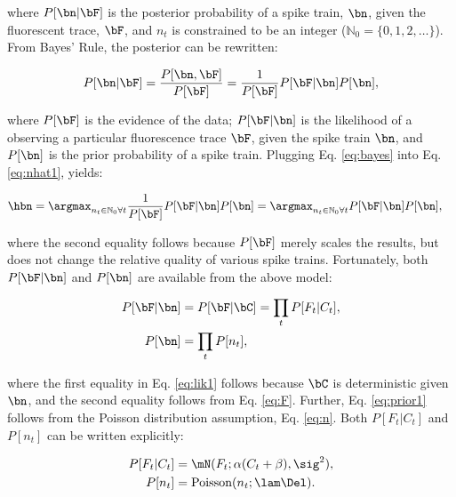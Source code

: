 \noindent where $P[\bn | \bF]$ is the posterior probability of a spike train, $\bn$, given the fluorescent trace, $\bF$, and $n_t$ is constrained to be an integer ($\mathbb{N}_0=\{0,1,2,\ldots\}$).  From Bayes' Rule, the posterior can be rewritten:

\begin{align} \label{eq:bayes}
P[\bn | \bF] = \frac{P[\bn, \bF]}{P[\bF]} = \frac{1}{P[\bF]} P[\bF | \bn] P[\bn],
\end{align}

\noindent where $P[\bF]$ is the evidence of the data; $P[\bF | \bn]$ is the likelihood of a observing a particular fluorescence trace $\bF$, given the spike train $\bn$, and $P[\bn]$ is the prior probability of a spike train.  Plugging Eq. \eqref{eq:bayes} into Eq. \eqref{eq:nhat1}, yields:

\begin{align} \label{eq:nhat2} 
\hbn &=  \anx \frac{1}{P[\bF]} P[\bF | \bn] P[\bn] =  \anx  P[\bF | \bn] P[\bn],
\end{align}

\noindent where the second equality follows because $P[\bF]$ merely scales the results, but does not change the relative quality of various spike trains.  Fortunately, both $P[\bF | \bn]$ and $P[\bn]$ are available from the above model:

\begin{subequations} \label{eq:post1}
\begin{align}
P[\bF | \bn]&= P[\bF | \bC] 	= \prod_t P[F_t | C_t], \label{eq:lik1} \\ 
P[\bn] 		&= \prod_t P[n_t], \label{eq:prior1}
\end{align}
\end{subequations}

\noindent where the first equality in Eq. \eqref{eq:lik1} follows because $\bC$ is deterministic given $\bn$, and the second equality follows from Eq. \eqref{eq:F}. Further, Eq. \eqref{eq:prior1} follows from the Poisson distribution assumption, Eq. \eqref{eq:n}.  Both $P[F_t | C_t]$ and $P[n_t]$ can be written explicitly:

\begin{subequations} \label{eq:post2}
\begin{align}
P[F_t | C_t] &= \mN(F_t; \alpha(C_t+\beta),\sig^2), \label{eq:lik2} \\
P[n_t] &= \text{Poisson}(n_t; \lam \Del). \label{eq:prior2} 
\end{align}
\end{subequations}

